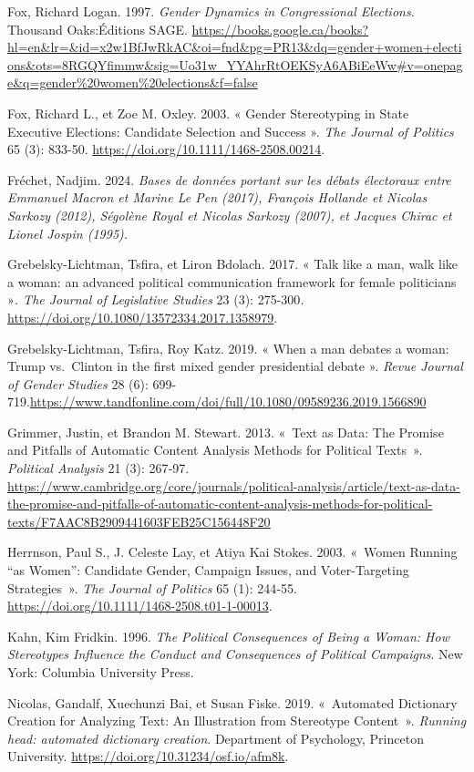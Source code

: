 \documentclass[
  letterpaper,
  DIV=11,
  numbers=noendperiod]{scrartcl}
\begin{document}
Fox, Richard Logan. 1997. \emph{Gender Dynamics in Congressional
Elections}. Thousand Oaks:Éditions SAGE.
\url{https://books.google.ca/books?hl=en\&lr=\&id=x2w1BfJwRkAC\&oi=fnd\&pg=PR13\&dq=gender+women+elections\&ots=8RGQYfimmw\&sig=Uo31w_YYAhrRtOEKSyA6ABiEeWw\#v=onepage\&q=gender\%20women\%20elections\&f=false}

Fox, Richard L., et Zoe M. Oxley. 2003. « Gender Stereotyping in State
Executive Elections: Candidate Selection and Success ». \emph{The
Journal of Politics} 65 (3): 833-50.
\url{https://doi.org/10.1111/1468-2508.00214}.

Fréchet, Nadjim. 2024. \emph{Bases de données portant sur les débats
électoraux entre Emmanuel Macron et Marine Le Pen (2017), François
Hollande et Nicolas Sarkozy (2012), Ségolène Royal et Nicolas Sarkozy
(2007), et Jacques Chirac et Lionel Jospin (1995).}

Grebelsky-Lichtman, Tsfira, et Liron Bdolach. 2017. « Talk like a man,
walk like a woman: an advanced political communication framework for
female politicians »\emph{. The Journal of} \emph{Legislative Studies}
23 (3): 275-300\emph{.}
\url{https://doi.org/10.1080/13572334.2017.1358979}.

Grebelsky-Lichtman, Tsfira, Roy Katz. 2019. « When a man debates a
woman: Trump vs.~Clinton in the first mixed gender presidential debate
». \emph{Revue Journal of Gender Studies} 28 (6):
699-719.\url{https://www.tandfonline.com/doi/full/10.1080/09589236.2019.1566890}

Grimmer, Justin, et Brandon M. Stewart. 2013. «~Text as Data: The
Promise and Pitfalls of Automatic Content Analysis Methods for Political
Texts~». \emph{Political Analysis} 21 (3): 267‑97.
\url{https://www.cambridge.org/core/journals/political-analysis/article/text-as-data-the-promise-and-pitfalls-of-automatic-content-analysis-methods-for-political-texts/F7AAC8B2909441603FEB25C156448F20}

Herrnson, Paul S., J. Celeste Lay, et Atiya Kai Stokes. 2003. «~Women
Running ``as Women'': Candidate Gender, Campaign Issues, and
Voter-Targeting Strategies~». \emph{The Journal of Politics} 65 (1):
244‑55. \url{https://doi.org/10.1111/1468-2508.t01-1-00013}.

Kahn, Kim Fridkin. 1996. \emph{The Political Consequences of Being a
Woman: How Stereotypes Influence the Conduct and Consequences of
Political Campaigns}. New York: Columbia University Press.

Nicolas, Gandalf, Xuechunzi Bai, et Susan Fiske. 2019. «~Automated
Dictionary Creation for Analyzing Text: An Illustration from Stereotype
Content~». \emph{Running head: automated dictionary creation}.
Department of Psychology, Princeton University.
\url{https://doi.org/10.31234/osf.io/afm8k}.
\end{document}
